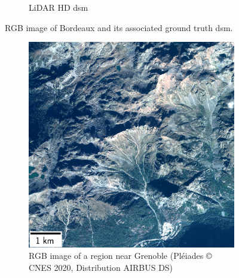 \begin{figure}
\begin{subfigure}[t]{0.48\linewidth}
        \caption{LiDAR HD \acrshort{dsm}}
        \label{fig:miniature_Bordeaux_gt}
    \end{subfigure}
    \caption{RGB image of Bordeaux and its associated ground truth \acrshort{dsm}.}
    \label{fig:miniature_Bordeaux}
\end{figure}

\begin{figure}
    \centering
    \begin{subfigure}[t]{0.48\linewidth}
        \flushleft
        \includegraphics[width=\linewidth]{Images/Chap_6/miniature_Grenoble.png}
        \caption{RGB image of a region near Grenoble (Pléiades © CNES 2020, Distribution AIRBUS DS)}
        \label{fig:miniature_Grenoble_rgb}
    \end{subfigure}\hfill
    \begin{subfigure}[t]{0.48\linewidth}
        \flushright

\end{subfigure}
\end{figure}
